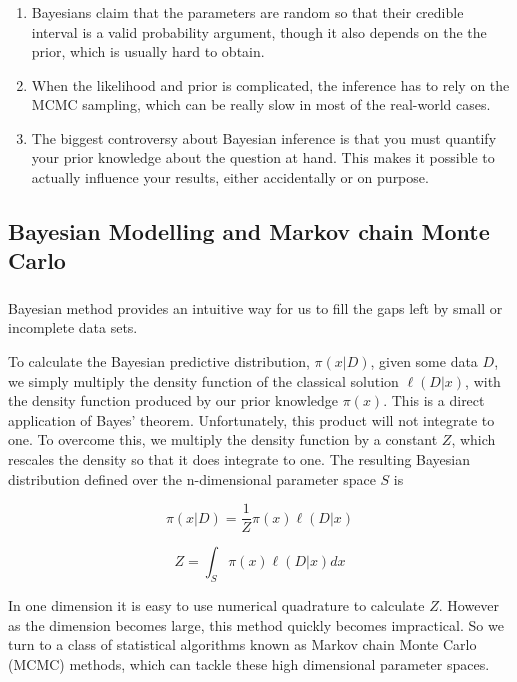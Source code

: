 \documentclass[c, dvipsnames]{beamer}  %
\begin{document}
\begin{frame}[shrink=5]
\frametitle{\insertsection} 
\framesubtitle{\insertsubsection}


\begin{enumerate}
	\item  Bayesians claim that the parameters are random so that their credible interval is a valid probability argument, though it also depends on the  the prior, which is usually hard to obtain.
	
	\item When the likelihood and prior is complicated, the inference has to rely on the MCMC sampling, which can be really slow in most of the real-world cases.

	\item  The biggest controversy about Bayesian inference is that you must quantify your prior knowledge about the question at hand. This makes it possible to actually influence your results, either accidentally or on purpose. 	
\end{enumerate}
\end{frame}






\subsection{Bayesian Modelling and Markov chain Monte Carlo}


\begin{frame}[shrink=5]
\frametitle{\insertsection} 
\framesubtitle{\insertsubsection}

Bayesian method provides an intuitive way for us to fill the gaps left by small or incomplete data sets. 


To calculate the Bayesian predictive distribution, $\pi(x|D)$, given some data $D$,  we simply multiply the density function of the classical solution  $\ell (D|x)$,  with the density function produced by our prior knowledge $\pi(x)$. This is a direct application of Bayes’ theorem. Unfortunately, this product will not integrate to one. To overcome this, we multiply the density function by a constant $Z$, which rescales the density so that it does integrate to one. The resulting Bayesian distribution defined over the n-dimensional parameter space $S$ is

$$ \pi(x|D) = \frac{1}{Z} \pi(x) \ell(D|x)$$

$$ Z = \int_S \pi(x) \ell(D|x) dx$$

In one dimension it is easy to use numerical quadrature to calculate $Z$. However as the dimension becomes large, this method quickly becomes impractical. So we turn to a class of statistical algorithms known as Markov chain Monte Carlo (MCMC) methods, which can tackle these high dimensional parameter spaces.



\end{frame}
\end{document}
